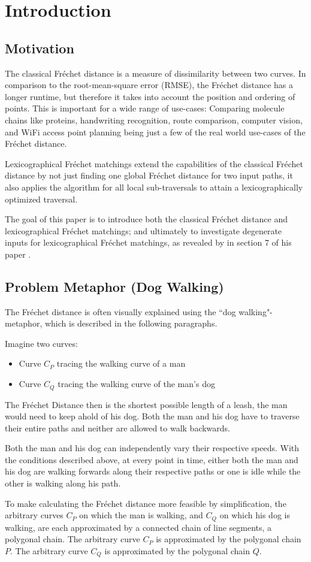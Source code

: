\section{Introduction}

\subsection{Motivation}
	The classical Fréchet distance is a measure of dissimilarity between two curves. In comparison to the root-mean-square error (RMSE), the Fréchet distance has a longer runtime, but therefore it takes into account the position and ordering of points. This is important for a wide range of use-cases: Comparing molecule chains like proteins, handwriting recognition, route comparison, computer vision, and WiFi access point planning being just a few of the real world use-cases of the Fréchet distance.
	
	Lexicographical Fréchet matchings extend the capabilities of the classical Fréchet distance by not just finding one global Fréchet distance for two input paths, it also applies the algorithm for all local sub-traversals to attain a lexicographically optimized traversal.
	
	The goal of this paper is to introduce both the classical Fréchet distance and lexicographical Fréchet matchings; and ultimately to investigate degenerate inputs for lexicographical Fréchet matchings, as revealed by \citeauthor{rotelex} in section 7 of his \citeyear{rotelex} paper \cite{rotelex}.
	

\subsection{Problem Metaphor (Dog Walking)} \label{dogwalking}

The Fréchet distance is often visually explained using the ``dog walking"-metaphor, which is described in the following paragraphs.

Imagine two curves:
\begin{itemize}
	\item Curve $C_P$ tracing the walking curve of a man
	\item Curve $C_Q$ tracing the walking curve of the man's dog
\end{itemize}

The Fréchet Distance then is the shortest possible length of a leash, the man would need to keep ahold of his dog. Both the man and his dog have to traverse their entire paths and neither are allowed to walk backwards.

Both the man and his dog can independently vary their respective speeds. With the conditions described above, at every point in time, either both the man and his dog are walking forwards along their respective paths or one is idle while the other is walking along his path.

To make calculating the Fréchet distance more feasible by simplification, the arbitrary curves $C_P$ on which the man is walking, and $C_Q$ on which his dog is walking, are each approximated by a connected chain of line segments, a polygonal chain. The arbitrary curve $C_P$ is approximated by the polygonal chain $P$. The arbitrary curve $C_Q$ is approximated by the polygonal chain $Q$.